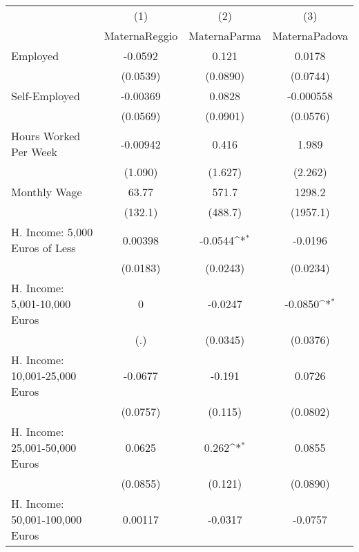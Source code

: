 {
\def\sym#1{\ifmmode^{#1}\else\(^{#1}\)\fi}
\begin{tabular}{l*{3}{c}}
\hline\hline
            &\multicolumn{1}{c}{(1)}&\multicolumn{1}{c}{(2)}&\multicolumn{1}{c}{(3)}\\
            &\multicolumn{1}{c}{MaternaReggio}&\multicolumn{1}{c}{MaternaParma}&\multicolumn{1}{c}{MaternaPadova}\\
\hline
Employed    &     -0.0592         &       0.121         &      0.0178         \\
            &    (0.0539)         &    (0.0890)         &    (0.0744)         \\
[1em]
Self-Employed&    -0.00369         &      0.0828         &   -0.000558         \\
            &    (0.0569)         &    (0.0901)         &    (0.0576)         \\
[1em]
Hours Worked Per Week&    -0.00942         &       0.416         &       1.989         \\
            &     (1.090)         &     (1.627)         &     (2.262)         \\
[1em]
Monthly Wage&       63.77         &       571.7         &      1298.2         \\
            &     (132.1)         &     (488.7)         &    (1957.1)         \\
[1em]
H. Income: 5,000 Euros of Less&     0.00398         &     -0.0544\sym{*}  &     -0.0196         \\
            &    (0.0183)         &    (0.0243)         &    (0.0234)         \\
[1em]
H. Income: 5,001-10,000 Euros&           0         &     -0.0247         &     -0.0850\sym{*}  \\
            &         (.)         &    (0.0345)         &    (0.0376)         \\
[1em]
H. Income: 10,001-25,000 Euros&     -0.0677         &      -0.191         &      0.0726         \\
            &    (0.0757)         &     (0.115)         &    (0.0802)         \\
[1em]
H. Income: 25,001-50,000 Euros&      0.0625         &       0.262\sym{*}  &      0.0855         \\
            &    (0.0855)         &     (0.121)         &    (0.0890)         \\
[1em]
H. Income: 50,001-100,000 Euros&     0.00117         &     -0.0317         &     -0.0757         \\

\end{tabular}}
